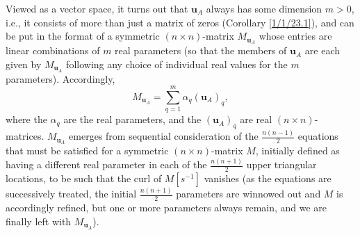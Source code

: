 \documentclass{amsart}
\numberwithin{equation}{section}
\theoremstyle{definition}
\numberwithin{theorem}{section}
\begin{document}
 Viewed as a vector space, it turns out that $\mathbf{u}_A$ always has some dimension $m>0$, i.e., it consists of more than just a matrix of zeros (Corollary \ref{1/1/23.1}), and can be put in the format of a symmetric $(n\times n)$-matrix $M_{\mathbf{u}_A}$ whose entries are linear combinations of $m$ real parameters (so that the members of $\mathbf{u}_A$ are each given by $M_{\mathbf{u}_A}$ following any choice of individual real values for the $m$ parameters).  Accordingly, \[ M_{\mathbf{u}_A} = \sum_{q=1}^m \alpha_q (\mathbf{u}_A)_q,\] where the $\alpha_q$ are the real parameters, and the $(\mathbf{u}_A)_q$ are real $(n\times n)$-matrices.  $M_{\mathbf{u}_A}$ emerges from sequential consideration of the $\frac{n(n-1)}{2}$ equations that must be satisfied for a symmetric $(n\times n)$-matrix $M$, initially defined as having a different real parameter in each of the $\frac{n(n+1)}{2}$ upper triangular locations, to be such that the curl of $M[s^{-1}]$ vanishes (as the equations are successively treated, the initial $\frac{n(n+1)}{2}$ parameters are winnowed out and $M$ is accordingly refined, but one or more parameters always remain, and we are finally left with $M_{\mathbf{u}_A}$).  
\end{document}
